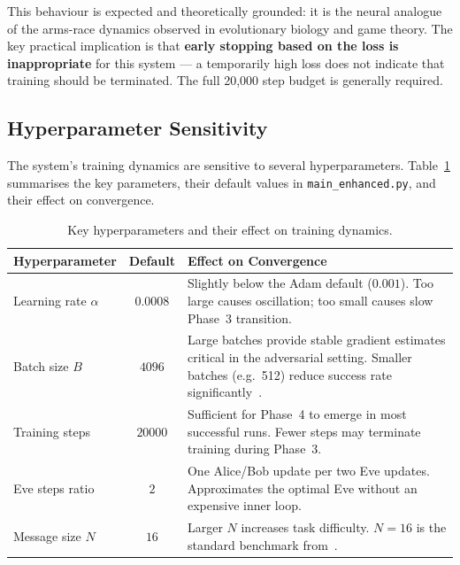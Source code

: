 \documentclass[12pt, a4paper]{article}
\newcommand{\code}[1]{\texttt{\color{CodeRed}#1}}
\begin{document}
\noindent This behaviour is expected and theoretically grounded: it is
the neural analogue of the arms-race dynamics observed in evolutionary
biology and game theory. The key practical implication is that
\textbf{early stopping based on the loss is inappropriate} for this
system --- a temporarily high loss does not indicate that training should
be terminated. The full 20{,}000 step budget is generally required.

\subsection{Hyperparameter Sensitivity}
\label{subsec:hyperparams}

The system's training dynamics are sensitive to several hyperparameters.
Table~\ref{tab:hyperparams} summarises the key parameters, their default
values in \code{main\_enhanced.py}, and their effect on convergence.

\begin{table}[H]
  \centering
  \caption{Key hyperparameters and their effect on training dynamics.}
  \label{tab:hyperparams}
  \renewcommand{\arraystretch}{1.4}
  \begin{tabularx}{\linewidth}{@{} l c X @{}}
    \toprule
    \textbf{Hyperparameter} & \textbf{Default} & \textbf{Effect on Convergence} \\
    \midrule
    Learning rate $\alpha$  & $0.0008$ &
      Slightly below the Adam default ($0.001$). Too large causes
      oscillation; too small causes slow Phase~3 transition. \\[4pt]
    Batch size $B$          & $4096$ &
      Large batches provide stable gradient estimates critical in the
      adversarial setting. Smaller batches (e.g.\ 512) reduce success
      rate significantly~\cite{abadi2016learning}. \\[4pt]
    Training steps          & $20000$ &
      Sufficient for Phase~4 to emerge in most successful runs. Fewer
      steps may terminate training during Phase~3. \\[4pt]
    Eve steps ratio         & $2$ &
      One Alice/Bob update per two Eve updates. Approximates the
      optimal Eve without an expensive inner loop. \\[4pt]
    Message size $N$        & $16$ &
      Larger $N$ increases task difficulty. $N=16$ is the standard
      benchmark from~\cite{abadi2016learning}. \\
    \bottomrule
  \end{tabularx}
\end{table}
\end{document}

